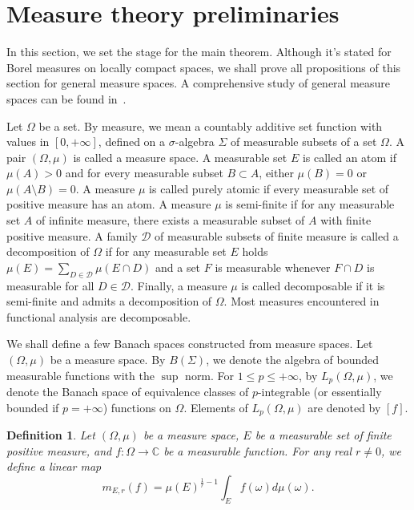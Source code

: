 \documentclass[12pt]{article}
\newtheorem{definition}[theorem]{Definition}
\begin{document}

\section{Measure theory preliminaries}
\label{MeasThPrelim}

In this section, we set the stage for the main theorem. Although it's stated 
for Borel measures on locally compact spaces, we shall prove all propositions of 
this section for general measure spaces. A comprehensive study of general 
measure spaces can be found in~\cite{FremMeasTh2}.

Let $\Omega$ be a set. By measure, we mean a countably additive set function 
with values in $[0,+\infty]$, defined on a $\sigma$-algebra $\Sigma$ of 
measurable subsets of a set $\Omega$. A pair $(\Omega,\mu)$ is 
called a measure space. A measurable set $E$ is called an atom 
if $\mu(A)>0$ and for every measurable subset $B\subset A$, either $\mu(B)=0$ 
or $\mu(A\setminus B)=0$. A measure $\mu$ is called purely atomic if every 
measurable set of positive measure has an atom. A measure $\mu$ is semi-finite 
if for any measurable set $A$ of infinite measure, there exists a measurable 
subset of $A$ with finite positive measure. A family $\mathcal{D}$ of 
measurable subsets of finite measure is called a decomposition of $\Omega$ if 
for any measurable set $E$ holds $\mu(E)=\sum_{D\in\mathcal{D}}\mu(E\cap D)$ 
and a set $F$ is measurable whenever $F\cap D$ is measurable for 
all $D\in\mathcal{D}$. Finally, a measure $\mu$ is called decomposable if it 
is semi-finite and admits a decomposition of $\Omega$. Most measures 
encountered in functional analysis are decomposable. 

We shall define a few Banach spaces constructed from measure spaces. 
Let $(\Omega,\mu)$ be a measure space. By $B(\Sigma)$, we denote the algebra of 
bounded measurable functions with the $\sup$ norm. For $1\leq p\leq +\infty$, 
by $L_p(\Omega,\mu)$, we denote the Banach space of equivalence classes of 
$p$-integrable (or essentially bounded if $p=+\infty$) functions on $\Omega$. 
Elements of $L_p(\Omega,\mu)$ are denoted by $[f]$.

\begin{definition}\label{GnrlzdMean}
    Let $(\Omega,\mu)$ be a measure space, $E$ be a measurable set of finite 
    positive measure, and $f:\Omega\to\mathbb{C}$ be a measurable function. For 
    any real $r\neq 0$, we define a linear map
    \[
        m_{E,r}(f)=\mu(E)^{\frac{1}{r}-1}\int_E f(\omega)d\mu(\omega).
    \]
\end{definition}
\end{document}
